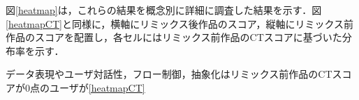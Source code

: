 \documentclass[submit,techrep,noauthor]{ipsj}
\newcommand{\memo}[1]{\colorbox{magenta!30}{\textbf{MEMO}}{\color{red!50}\textbf{[#1]}}}
\begin{document}


図\ref{heatmap}は，これらの結果を概念別に詳細に調査した結果を示す．図\ref{heatmapCT}と同様に，横軸にリミックス後作品のスコア，縦軸にリミックス前作品のスコアを配置し，各セルにはリミックス前作品のCTスコアに基づいた分布率を示す．

データ表現やユーザ対話性，フロー制御，抽象化はリミックス前作品のCTスコアが0点のユーザが\ref{heatmapCT}







\end{document}

